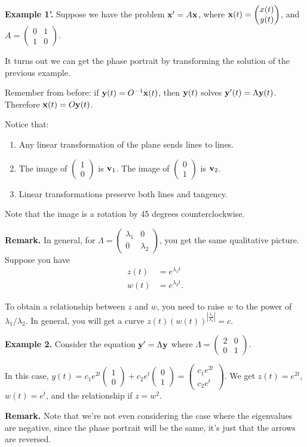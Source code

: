 \documentclass{article}
\newcommand{\mat}[1]{\begin{pmatrix}#1\end{pmatrix}}
\begin{document}
{\bf Example 1'.} Suppose we have the problem $\mathbf{x}' = A \mathbf{x}$, where $\mbf{x}(t) = \mat{x(t) \\ y(t)}$, and $A = \mat{0 & 1 \\ 1 & 0}$.

It turns out we can get the phase portrait by transforming the solution of the previous example.

Remember from before: if $\mathbf{y}(t) = O^{-1} \mathbf{x}(t)$, then $\mathbf{y}(t)$ solves $\mathbf{y}'(t) = \Lambda \mathbf{y}(t)$.  Therefore $\mathbf{x}(t) = O \mathbf{y}(t)$.

Notice that:

\begin{enumerate}
  \item Any linear transformation of the plane sends lines to lines.
  \item The image of $\mat{1 \\ 0}$ is $\mathbf{v}_1$.  The image of $\mat{0 \\ 1}$ is $\mathbf{v}_2$.
  \item Linear transformations preserve both lines and tangency.
\end{enumerate}

Note that the image is a rotation by 45 degrees counterclockwise.

{\bf Remark.} In general, for $\Lambda = \mat{\lambda_1 & 0 \\ 0 & \lambda_2}$, you get the same qualitative picture.  Suppose you have
\begin{align*}
  z(t) &= e^{\lambda_1 t} \\
  w(t) &= e^{\lambda_2 t}.
\end{align*}

To obtain a relationship between $z$ and $w$, you need to raise $w$ to the power of $\lambda_1 / \lambda_2$.  In general, you will get a curve $z(t) (w(t))^{| \frac{\lambda_1}{\lambda_2} |} = c$.

{\bf Example 2.} Consider the equation $\mathbf{y}' = \Lambda \mathbf{y}$ where $\Lambda = \mat{2 & 0 \\ 0 & 1}$.

In this case,  $y(t) = c_1 e^{2t} \mat{1 \\ 0} + c_2 e^{t} \mat{0 \\ 1} = \mat{c_1 e^{2t} \\ c_2 e^{t}}$.  We get $z(t) = e^{2t}$, $w(t) = e^t$, and the relationship if $z = w^2$.

{\bf Remark.} Note that we're not even considering the case where the eigenvalues are negative, since the phase portrait will be the same, it's just that the arrows are reversed.
\end{document}
